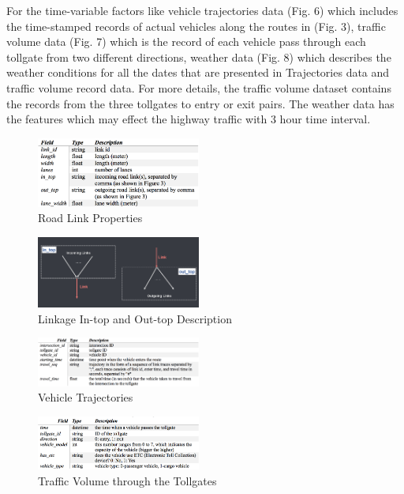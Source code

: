 \documentclass[journal, letterpaper]{IEEEtran}
\begin{document}
For the time-variable factors like vehicle trajectories data (Fig. 6) which includes the time-stamped records of actual vehicles along the routes in (Fig. 3), traffic volume data (Fig. 7) which is the record of each vehicle pass through each tollgate from two different directions, weather data (Fig. 8) which describes the weather conditions for all the dates that are presented in Trajectories data and traffic volume record data. For more details, the traffic volume dataset contains the records from the three tollgates to entry or exit pairs. The weather data has the features which may effect the highway traffic with 3 hour time interval.

\begin{figure} [H]
  \centering
  \includegraphics[width=0.48\textwidth]{road-link.png}
  \caption{Road Link Properties}
  \label{fig:4}
\end{figure}
\begin{figure} [H]
  \centering
  \includegraphics[width=0.48\textwidth]{in-out.png}
  \caption{Linkage In-top and Out-top Description}
  \label{fig:5}
\end{figure}

\begin{figure} [H]
  \centering
  \includegraphics[width=0.48\textwidth]{trajectories.png}
  \caption{Vehicle Trajectories}
  \label{fig:6}
\end{figure}

\begin{figure} [H]
  \centering
  \includegraphics[width=0.48\textwidth]{volume.png}
  \caption{Traffic Volume through the Tollgates}
  \label{fig:7}
\end{figure}
\end{document}
